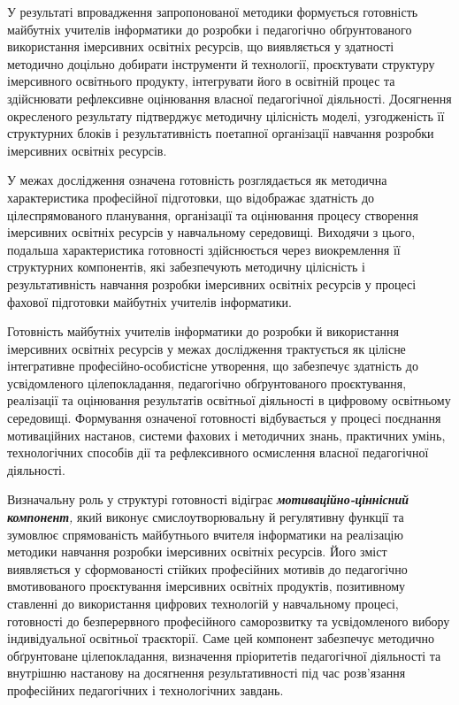 У результаті впровадження запропонованої методики формується готовність майбутніх учителів інформатики до розробки і педагогічно обґрунтованого використання імерсивних освітніх ресурсів, що виявляється у здатності методично доцільно добирати інструменти й технології, проєктувати структуру імерсивного освітнього продукту, інтегрувати його в освітній процес та здійснювати рефлексивне оцінювання власної педагогічної діяльності. Досягнення окресленого результату підтверджує методичну цілісність моделі, узгодженість її структурних блоків і результативність поетапної організації навчання розробки імерсивних освітніх ресурсів.

У межах дослідження означена готовність розглядається як методична характеристика професійної підготовки, що відображає здатність до цілеспрямованого планування, організації та оцінювання процесу створення імерсивних освітніх ресурсів у навчальному середовищі. Виходячи з цього, подальша характеристика готовності здійснюється через виокремлення її структурних компонентів, які забезпечують методичну цілісність і результативність навчання розробки імерсивних освітніх ресурсів у процесі фахової підготовки майбутніх учителів інформатики.

Готовність майбутніх учителів інформатики до розробки й використання імерсивних освітніх ресурсів у межах дослідження трактується як цілісне інтегративне професійно-особистісне утворення, що забезпечує здатність до усвідомленого цілепокладання, педагогічно обґрунтованого проєктування, реалізації та оцінювання результатів освітньої діяльності в цифровому освітньому середовищі. Формування означеної готовності відбувається у процесі поєднання мотиваційних настанов, системи фахових і методичних знань, практичних умінь, технологічних способів дії та рефлексивного осмислення власної педагогічної діяльності.

Визначальну роль у структурі готовності відіграє \emph{\textbf{мотиваційно-ціннісний компонент},} який виконує смислоутворювальну й регулятивну функції та зумовлює спрямованість майбутнього вчителя інформатики на реалізацію методики навчання розробки імерсивних освітніх ресурсів. Його зміст виявляється у сформованості стійких професійних мотивів до педагогічно вмотивованого проєктування імерсивних освітніх продуктів, позитивному ставленні до використання цифрових технологій у навчальному процесі, готовності до безперервного професійного саморозвитку та усвідомленого вибору індивідуальної освітньої траєкторії. Саме цей компонент забезпечує методично обґрунтоване цілепокладання, визначення пріоритетів педагогічної діяльності та внутрішню настанову на досягнення результативності під час розв'язання професійних педагогічних і технологічних завдань.

